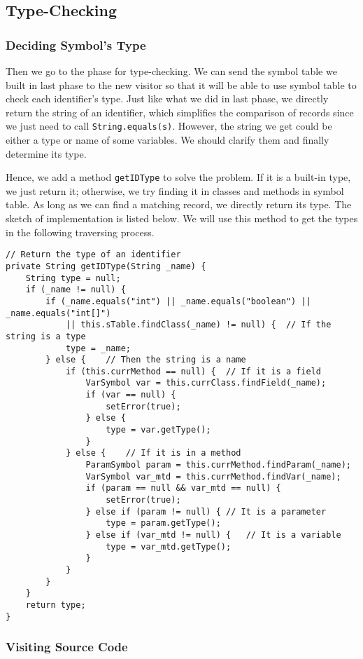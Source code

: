 \documentclass[letterpaper, 14pt]{article}
\begin{document}
\subsection{Type-Checking}

\subsubsection{Deciding Symbol's Type}

Then we go to the phase for type-checking. We can send the symbol table we built in last phase to the new visitor so that it will be able to use symbol table to check each identifier's type. Just like what we did in last phase, we directly return the string of an identifier, which simplifies the comparison of records since we just need to call \texttt{String.equals(s)}. However, the string we get could be either a type or name of some variables. We should clarify them and finally determine its type. 

Hence, we add a method \texttt{getIDType} to solve the problem. If it is a built-in type, we just return it; otherwise, we try finding it in classes and methods in symbol table. As long as we can find a matching record, we directly return its type. The sketch of implementation is listed below. We will use this method to get the types in the following traversing process. 
\begin{lstlisting}
// Return the type of an identifier
private String getIDType(String _name) {
	String type = null;
	if (_name != null) {
		if (_name.equals("int") || _name.equals("boolean") || _name.equals("int[]") 
			|| this.sTable.findClass(_name) != null) {	// If the string is a type
			type = _name;
		} else {	// Then the string is a name
			if (this.currMethod == null) {	// If it is a field
				VarSymbol var = this.currClass.findField(_name);
				if (var == null) {
					setError(true);
				} else {
					type = var.getType();
				}
			} else {	// If it is in a method
				ParamSymbol param = this.currMethod.findParam(_name);
				VarSymbol var_mtd = this.currMethod.findVar(_name);
				if (param == null && var_mtd == null) {
					setError(true);
				} else if (param != null) {	// It is a parameter
					type = param.getType();
				} else if (var_mtd != null) {	// It is a variable
					type = var_mtd.getType();
				}
			}
		}
	}
	return type;
}
\end{lstlisting}

\subsubsection{Visiting Source Code}
\end{document}

